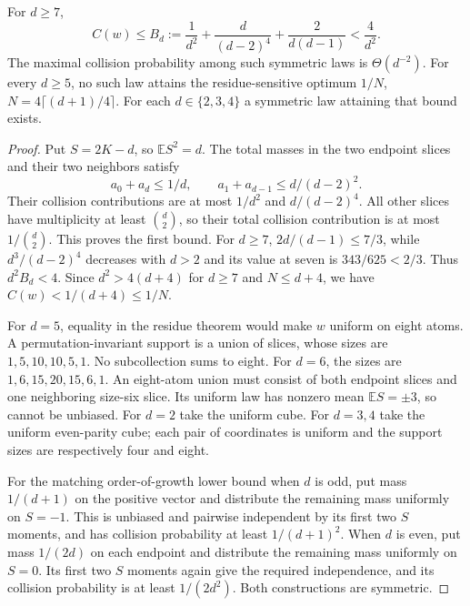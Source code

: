 \begin{theorem}
\label{thm:symmetry-collision}
For $d\ge7$,
\[
 C(w)\le B_d:=\frac1{d^2}+\frac d{(d-2)^4}
                    +\frac2{d(d-1)}<\frac4{d^2}.
\]
The maximal collision probability among such symmetric laws is
$\Theta(d^{-2})$. For every $d\ge5$, no such law attains the
residue-sensitive optimum
$1/N$, $N=4\lceil(d+1)/4\rceil$.
For each $d\in\{2,3,4\}$ a symmetric law attaining that bound exists.
\end{theorem}
\begin{proof}
Put $S=2K-d$, so $\mathbb E S^2=d$. The total masses in the two
endpoint slices and their two neighbors satisfy
\[
 a_0+a_d\le1/d,\qquad a_1+a_{d-1}\le d/(d-2)^2.
\]
Their collision contributions are at most $1/d^2$ and
$d/(d-2)^4$. All other slices have multiplicity at least
$\binom d2$, so their total collision contribution is at most
$1/\binom d2$. This proves the first bound. For $d\ge7$,
$2d/(d-1)\le7/3$, while $d^3/(d-2)^4$ decreases with $d>2$
and its value at seven is $343/625<2/3$. Thus $d^2B_d<4$.
Since $d^2>4(d+4)$ for $d\ge7$ and $N\le d+4$, we have
$C(w)<1/(d+4)\le1/N$.

For $d=5$, equality in the residue theorem would make $w$ uniform
on eight atoms. A permutation-invariant support is a union of slices,
whose sizes are $1,5,10,10,5,1$. No subcollection sums to eight.
For $d=6$, the sizes are $1,6,15,20,15,6,1$. An eight-atom union must
consist of both endpoint slices and one neighboring size-six slice.
Its uniform law has nonzero mean $\mathbb E S=\pm3$, so cannot be
unbiased. For $d=2$ take the uniform cube. For $d=3,4$ take the uniform
even-parity cube; each pair of coordinates is uniform and the support
sizes are respectively four and eight.

For the matching order-of-growth lower bound when $d$ is odd, put
mass $1/(d+1)$ on the positive vector and distribute the remaining
mass uniformly on $S=-1$. This is unbiased and pairwise independent
by its first two $S$ moments, and has collision probability at least
$1/(d+1)^2$. When $d$ is even, put mass $1/(2d)$ on each endpoint
and distribute the remaining mass uniformly on $S=0$. Its first two
$S$ moments again give the required independence, and its collision
probability is at least $1/(2d^2)$. Both constructions are symmetric.
\end{proof}


